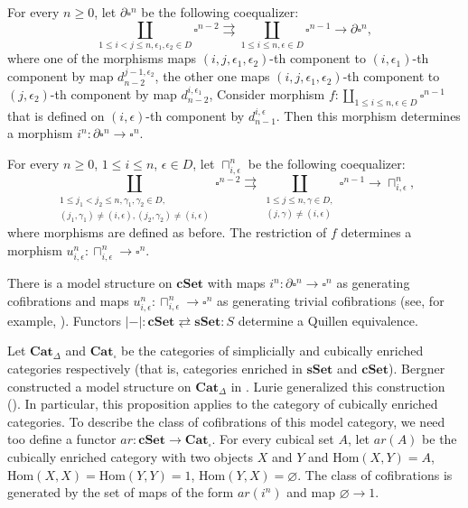 \documentclass[reqno]{amsart}
\theoremstyle{definition}
\theoremstyle{remark}
\newcommand{\cat}[1]{\mathbf{#1}}
\newcommand{\Cat}{\cat{Cat}}
\newcommand{\sSet}{\cat{sSet}}
\newcommand{\cSet}{\cat{cSet}}
\newcommand{\Hom}{\mathrm{Hom}}
\numberwithin{figure}{section}
\begin{document}
For every $n \geq 0$, let $\partial \square^n$ be the following coequalizer:
\[ \coprod_{1 \leq i < j \leq n, \epsilon_1,\epsilon_2 \in D} \square^{n-2} \rightrightarrows \coprod_{1 \leq i \leq n, \epsilon \in D} \square^{n-1} \to \partial \square^n, \]
where one of the morphisms maps $(i,j,\epsilon_1,\epsilon_2)$-th component to $(i,\epsilon_1)$-th component by map $d^{j-1,\epsilon_2}_{n-2}$,
the other one maps $(i,j,\epsilon_1,\epsilon_2)$-th component to $(j,\epsilon_2)$-th component by map $d^{i,\epsilon_1}_{n-2}$,
Consider morphism $f : \coprod_{1 \leq i \leq n, \epsilon \in D} \square^{n-1}$ that is defined on $(i,\epsilon)$-th component by $d^{i,\epsilon}_{n-1}$.
Then this morphism determines a morphism $i^n : \partial \square^n \to \square^n$.

For every $n \geq 0$, $1 \leq i \leq n$, $\epsilon \in D$, let $\sqcap^n_{i,\epsilon}$ be the following coequalizer:
\[ \coprod_{\substack{1 \leq j_1 < j_2 \leq n, \gamma_1,\gamma_2 \in D, \\ (j_1,\gamma_1) \neq (i,\epsilon), (j_2,\gamma_2) \neq (i,\epsilon)}} \square^{n-2} \rightrightarrows \coprod_{\substack{1 \leq j \leq n, \gamma \in D, \\ (j,\gamma) \neq (i,\epsilon)}} \square^{n-1} \to \sqcap^n_{i,\epsilon}, \]
where morphisms are defined as before.
The restriction of $f$ determines a morphism $u^n_{i,\epsilon} : \sqcap^n_{i,\epsilon} \to \square^n$.

There is a model structure on $\cSet$ with maps $i^n : \partial \square^n \to \square^n$ as generating cofibrations
and maps $u^n_{i,\epsilon} : \sqcap^n_{i,\epsilon} \to \square^n$ as generating trivial cofibrations (see, for example, \cite[Example~52, Theorem~88]{jardine}).
Functors $|-| : \cSet \rightleftarrows \sSet : S$ determine a Quillen equivalence.

Let $\Cat_\Delta$ and $\Cat_\square$ be the categories of simplicially and cubically enriched categories respectively (that is, categories enriched in $\sSet$ and $\cSet$).
Bergner constructed a model structure on $\Cat_\Delta$ in \cite{bergner}.
Lurie generalized this construction (\cite[Proposition~A.3.2.4]{lurie-topos}).
In particular, this proposition applies to the category of cubically enriched categories.
To describe the class of cofibrations of this model category, we need too define a functor $ar : \cSet \to \Cat_\square$.
For every cubical set $A$, let $ar(A)$ be the cubically enriched category with two objects $X$ and $Y$ and $\Hom(X,Y) = A$, $\Hom(X,X) = \Hom(Y,Y) = 1$, $\Hom(Y,X) = \varnothing$.
The class of cofibrations is generated by the set of maps of the form $ar(i^n)$ and map $\varnothing \to 1$.
\end{document}
